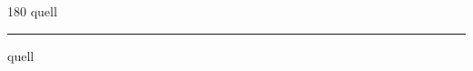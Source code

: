 
\begin{frame}
\begin{center}
\begin{turn}{180}
{\fontsize{2.5cm}{1em}\selectfont quell}
\end{turn}
\vspace{1em}\par  
\hrule
\vspace{1em}\par  
{\fontsize{2.5cm}{1em}\selectfont quell}
\end{center}
\end{frame}
